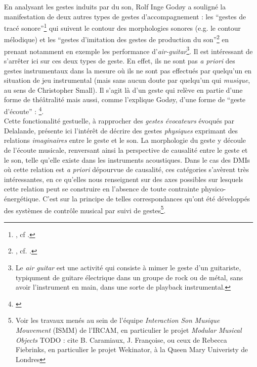 \indent En analysant les gestes induits par du son, Rolf Inge Godøy a souligné la manifestation de deux autres types de gestes d'accompagnement : les ``gestes de tracé sonore''\footnote{, cf \cite{godoy_exploring_2006}.} qui suivent le contour des morphologies sonores (e.g. le contour mélodique) et les ``gestes d'imitation des gestes de production du son''\footnote{, cf. \cite{godoy_playing_2005}.} en prenant notamment en exemple les performance d'\textit{air-guitar}\footnote{Le \textit{air guitar} est une activité qui consiste à mimer le geste d’un guitariste, typiqument de guitare électrique dans un groupe de rock ou de métal, sans avoir l’instrument en main, dans une sorte de playback instrumental.}. Il est intéressant de s'arrêter ici sur ces deux types de geste. En effet, ils ne sont pas \textit{a priori} des gestes instrumentaux dans la mesure où ils ne sont pas effectués par quelqu'un en situation de jeu instrumental (mais sans aucun doute par quelqu'un qui \textit{musique}, au sens de Christopher Small). Il s'agit là d'un geste qui relève en partie d'une forme de théâtralité mais aussi, comme l'explique Godøy, d'une forme de ``geste d'écoute'' :  \footnote{\cite{godoy_exploring_2006}}.\\
\indent Cette fonctionalité gestuelle, à rapprocher des \textit{gestes évocateurs} évoqués par Delalande, présente ici l'intérêt de décrire des gestes \textit{physiques} exprimant des relations \textit{imaginaires} entre le geste et le son. La morphologie du geste y découle de l'écoute musicale, renversant ainsi la perspective de causalité entre le geste et le son, telle qu'elle existe dans les instruments acoustiques. Dans le cas des \glspl{DMI} où cette relation est \textit{a priori} dépourvue de causalité, ces catégories s'avèrent très intéressantes, en ce qu'elles nous renseignent sur des axes possibles sur lesquels cette relation peut se construire en l'absence de toute contrainte physico-énergétique. C'est sur la principe de telles correspondances qu'ont été développés des systèmes de contrôle musical par suivi de gestes\footnote{Voir les travaux menés au sein de l'équipe \textit{Interaction Son Musique Mouvement} (ISMM) de l'\gls{IRCAM}, en particulier le projet \textit{Modular Musical Objects} TODO : cite B. Caramiaux, J. Françoise, ou ceux de Rebecca Fiebrinks, en particulier le projet Wekinator, \cite{fiebrink_wekinator:_2010} à la Queen Mary Univeristy de Londres}.\\
